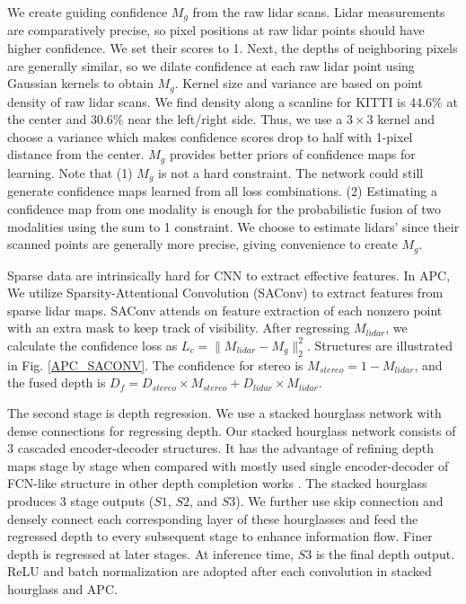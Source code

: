 \documentclass{article}
\begin{document}
We create guiding confidence $M_g$ from the raw lidar scans. Lidar measurements are comparatively precise, so pixel positions at raw lidar points should have higher confidence. We set their scores to 1. Next, the depths of neighboring pixels are generally similar, so we dilate confidence at each raw lidar point using Gaussian kernels to obtain $M_g$. Kernel size and variance are based on point density of raw lidar scans. We find density along a scanline for KITTI is 44.6\% at the center and 30.6\% near the left/right side. Thus, we use a $3\times 3$ kernel and choose a variance which makes confidence scores drop to half with 1-pixel distance from the center. $M_g$ provides better priors of confidence maps for learning. Note that (1) $M_g$ is not a hard constraint. The network could still generate confidence maps learned from all loss combinations. (2) Estimating a confidence map from one modality is enough for the probabilistic fusion of two modalities using the sum to 1 constraint. We choose to estimate lidars' since their scanned points are generally more precise, giving convenience to create $M_g$. 

Sparse data are intrinsically hard for CNN to extract effective features. In APC, We utilize Sparsity-Attentional Convolution (SAConv) \cite{zhong2019deep} to extract features from sparse lidar maps. SAConv attends on feature extraction of each nonzero point with an extra mask to keep track of visibility. After regressing $M_{lidar}$, we calculate the confidence loss as $L_c = \|M_{lidar}-M_g\|^2_2$. Structures are illustrated in Fig. \ref{APC_SACONV}. The confidence for stereo is $M_{stereo}=1-M_{lidar}$, and the fused depth is $ D_{f} = D_{stereo}\times M_{stereo}+ D_{lidar}\times M_{lidar}.$



The second stage is depth regression. We use a stacked hourglass network \cite{newell2016stacked} with dense connections for regressing depth. Our stacked hourglass network consists of 3 cascaded encoder-decoder structures. It has the advantage of refining depth maps stage by stage when compared with mostly used single encoder-decoder of FCN-like structure in other depth completion works \cite{ma2019self} \cite{Ma2017SparseToDense} \cite{zhong2019deep} \cite{Jaritz_2018}. The stacked hourglass produces 3 stage outputs ($S1$, $S2$, and $S3$). We further use skip connection and densely connect each corresponding layer of these hourglasses and feed the regressed depth to every subsequent stage to enhance information flow. Finer depth is regressed at later stages. At inference time, $S3$ is the final depth output. ReLU \cite{nair2010rectified} and batch normalization \cite{ioffe2015batch} are adopted after each convolution in stacked hourglass and APC. 
\end{document}
